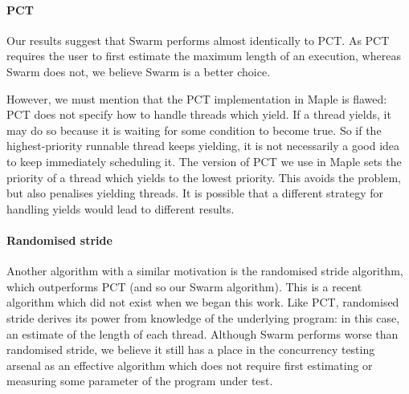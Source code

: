 \paragraph{PCT}
Our results suggest that Swarm performs almost identically to PCT.  As
PCT requires the user to first estimate the maximum length of an
execution, whereas Swarm does not, we believe Swarm is a better
choice.

However, we must mention that the PCT implementation in Maple is
flawed: PCT does not specify how to handle threads which yield.  If a
thread yields, it may do so because it is waiting for some condition
to become true.  So if the highest-priority runnable thread keeps
yielding, it is not necessarily a good idea to keep immediately
scheduling it.  The version of PCT we use in Maple sets the priority
of a thread which yields to the lowest priority.  This avoids the
problem, but also penalises yielding threads.  It is possible that a
different strategy for handling yields would lead to different
results.

\paragraph{Randomised stride}
Another algorithm with a similar motivation is the randomised stride
algorithm\cite{abdelrasoul2017}, which outperforms PCT (and so our
Swarm algorithm).  This is a recent algorithm which did not exist when
we began this work.  Like PCT, randomised stride derives its power
from knowledge of the underlying program: in this case, an estimate of
the length of each thread.  Although Swarm performs worse than
randomised stride, we believe it still has a place in the concurrency
testing arsenal as an effective algorithm which does not require first
estimating or measuring some parameter of the program under test.
